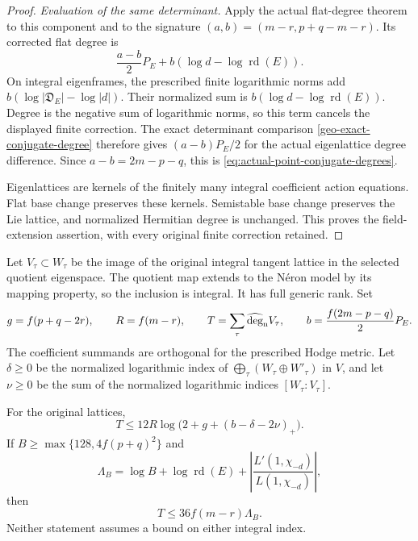 \begin{proof}
\emph{Evaluation of the same determinant.}
Apply the actual flat-degree theorem to this component and to the
signature $(a,b)=(m-r,p+q-m-r)$. Its corrected flat degree is
\[
 \frac{a-b}{2}P_E+b(\log d-\log\operatorname{rd}(E)).
\]
On integral eigenframes, the prescribed finite logarithmic norms
add $b(\log|\mathfrak D_E|-\log|d|)$. Their normalized sum is
$b(\log d-\log\operatorname{rd}(E))$. Degree is the negative
sum of logarithmic norms, so this term cancels the displayed finite
correction. The exact determinant comparison
\eqref{geo-exact-conjugate-degree} therefore gives
$(a-b)P_E/2$ for the actual eigenlattice degree difference.
Since $a-b=2m-p-q$, this is
\eqref{eq:actual-point-conjugate-degrees}.

Eigenlattices are kernels of the finitely many integral coefficient
action equations. Flat base change preserves these kernels.
Semistable base change preserves the Lie lattice, and normalized
Hermitian degree is unchanged. This proves the field-extension
assertion, with every original finite correction retained.
\end{proof}

Let $V_\tau\subset W_\tau$ be the image of the original integral
tangent lattice in the selected quotient eigenspace. The quotient
map extends to the N\'eron model by its mapping property, so the
inclusion is integral. It has full generic rank. Set
\[
 g=f(p+q-2r),\qquad R=f(m-r),\qquad
 T=\sum_\tau\widehat{\deg}_{\rm n}V_\tau,\qquad
 b=\frac{f(2m-p-q)}2P_E.
\]
The coefficient summands are orthogonal for the prescribed Hodge
metric. Let $\delta\ge0$ be the normalized logarithmic index of
$\bigoplus_\tau(W_\tau\oplus W'_\tau)$ in $V$, and let
$\nu\ge0$ be the sum of the normalized logarithmic indices
$[W_\tau:V_\tau]$.

\begin{corollary}
\label{cor:actual-selected-point-degrees}
For the original lattices,
\begin{equation}\label{eq:actual-selected-point-degrees}
 T\le12R\log\bigl(2+g+(b-\delta-2\nu)_+\bigr).
\end{equation}
If $B\ge\max\{128,4f(p+q)^2\}$ and
\[
 \Lambda_B=\log B+\log\operatorname{rd}(E)
                  +\left|\frac{L'(1,\chi_{-d})}{L(1,\chi_{-d})}\right|,
\]
then
\begin{equation}\label{eq:actual-selected-point-budget}
                       T\le36f(m-r)\Lambda_B.
\end{equation}
Neither statement assumes a bound on either integral index.
\end{corollary}

